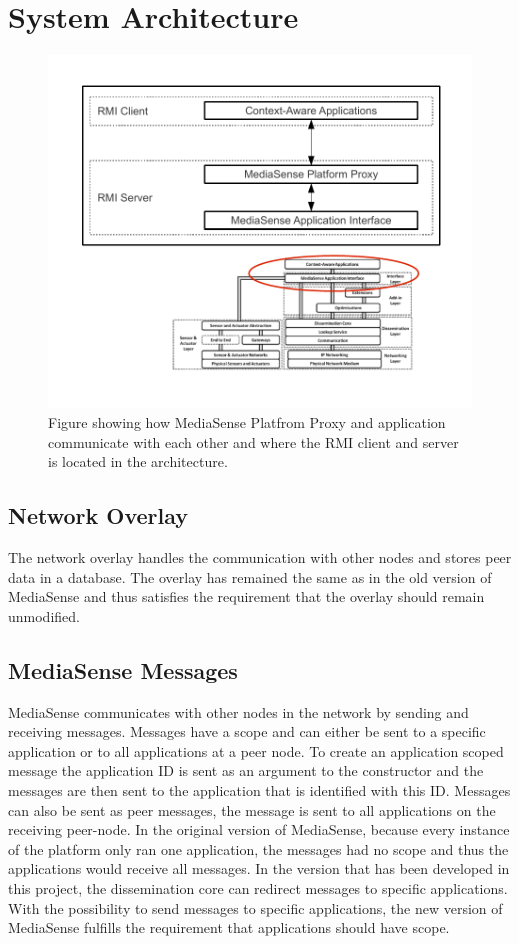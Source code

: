 \section{System Architecture}

\begin{figure}[h!]
	\centering
    	\includegraphics{part_6/artefact_description/changes.pdf}
		\caption{Figure showing how MediaSense Platfrom Proxy and application communicate with each other and where the RMI client and server is located in the architecture.} 
		\label{ds}
\end{figure}

\subsection{Network Overlay}
The network overlay handles the communication with other nodes and stores peer data in a database. The overlay has remained the same as in the old version of MediaSense and thus satisfies the requirement that the overlay should remain unmodified.

\subsection{MediaSense Messages}
MediaSense communicates with other nodes in the network by sending and receiving messages. Messages have a scope and can either be sent to a specific application or to all applications at a peer node. 
To create an application scoped message the application ID is sent as an argument to the constructor and the messages are then sent to the application that is identified with this ID. 
Messages can also be sent as peer messages, the message is sent to all applications on the receiving peer-node. In the original version of MediaSense, because every instance of the platform only ran one application, the messages had no scope and thus the applications would receive all messages. 
In the version that has been developed in this project, the dissemination core can redirect messages to specific applications. With the possibility to send messages to specific applications, the new version of MediaSense fulfills the requirement that applications should have scope.

